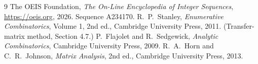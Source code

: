 \documentclass[11pt,a4paper]{article}
\theoremstyle{plain}
\theoremstyle{definition}
\begin{document}
\begin{thebibliography}{9}
 The OEIS Foundation, \emph{The On-Line Encyclopedia of Integer
Sequences}, \url{https://oeis.org}, 2026. Sequence A234170.
 R.~P.~Stanley, \emph{Enumerative Combinatorics}, Volume 1, 2nd ed.,
Cambridge University Press, 2011. (Transfer-matrix method, Section 4.7.)
 P.~Flajolet and R.~Sedgewick, \emph{Analytic Combinatorics}, Cambridge
University Press, 2009.
 R.~A.~Horn and C.~R.~Johnson, \emph{Matrix Analysis}, 2nd ed., Cambridge
University Press, 2013.
\end{thebibliography}
\end{document}
